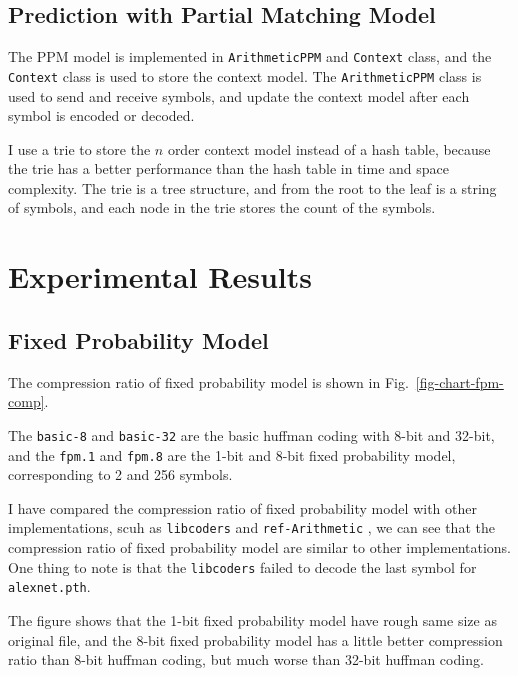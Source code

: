\documentclass[a4paper,conference]{IEEEtran}
\begin{document}
\subsection{Prediction with Partial Matching Model}

The PPM model is implemented in \texttt{ArithmeticPPM} and \texttt{Context} class, and the \texttt{Context} class is used to store the context model. The \texttt{ArithmeticPPM} class is used to send and receive symbols, and update the context model after each symbol is encoded or decoded.

I use a trie to store the $n$ order context model instead of a hash table, because the trie has a better performance than the hash table in time and space complexity. The trie is a tree structure, and from the root to the leaf is a string of symbols, and each node in the trie stores the count of the symbols.

\section{Experimental Results}

\subsection{Fixed Probability Model}

The compression ratio of fixed probability model is shown in Fig.~\ref{fig-chart-fpm-comp}.

The \texttt{basic-8} and \texttt{basic-32} are the basic huffman coding with 8-bit and 32-bit, and the \texttt{fpm.1} and \texttt{fpm.8} are the 1-bit and 8-bit fixed probability model, corresponding to 2 and 256 symbols.

I have compared the compression ratio of fixed probability model with other implementations, scuh as \texttt{libcoders} \cite{libcoders} and \texttt{ref-Arithmetic} \cite{Reference-arithmetic-coding}, we can see that the compression ratio of fixed probability model are similar to other implementations.
One thing to note is that the \texttt{libcoders} failed to decode the last symbol for \texttt{alexnet.pth}.

The figure shows that the 1-bit fixed probability model have rough same size as original file, and the 8-bit fixed probability model has a little better compression ratio than 8-bit huffman coding, but much worse than 32-bit huffman coding.
\end{document}
